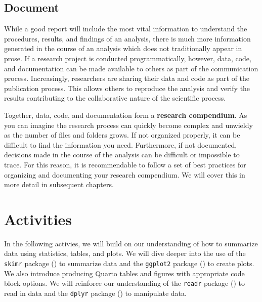 \documentclass[
  letterpaper,
]{latex/krantz}
\theoremstyle{definition}
\theoremstyle{remark}
\begin{document}
\subsection{Document}\label{sec-aa-document}

While a good report will include the most vital information to
understand the procedures, results, and findings of an analysis, there
is much more information generated in the course of an analysis which
does not traditionally appear in prose. If a research project is
conducted programmatically, however, data, code, and documentation can
be made available to others as part of the communication process.
Increasingly, researchers are sharing their data and code as part of the
publication process. This allows others to reproduce the analysis and
verify the results contributing to the collaborative nature of the
scientific process.

Together, data, code, and documentation form a \textbf{research
compendium}. As you can imagine the research process can quickly become
complex and unwieldy as the number of files and folders grows. If not
organized properly, it can be difficult to find the information you
need. Furthermore, if not documented, decisions made in the course of
the analysis can be difficult or impossible to trace. For this reason,
it is recommendable to follow a set of best practices for organizing and
documenting your research compendium. We will cover this in more detail
in subsequent chapters.

\section*{Activities}\label{activities-1}


In the following activies, we will build on our understanding of how to
summarize data using statistics, tables, and plots. We will dive deeper
into the use of the \texttt{skimr} package
() to summarize data and the
\texttt{ggplot2} package ()
to create plots. We also introduce producing Quarto tables and figures
with appropriate code block options. We will reinforce our understanding
of the \texttt{readr} package () to read in data and the \texttt{dplyr} package
() to manipulate data.
\end{document}
